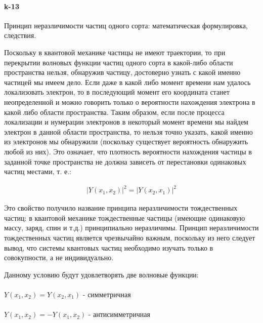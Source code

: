 


\paragraph{k-13}
Принцип неразличимости частиц одного сорта: математическая формулировка, следствия.


Поскольку в квантовой механике частицы не имеют траектории, то при перекрытии волновых функции частиц одного сорта в какой-либо области пространства нельзя, обнаружив частицу, достоверно узнать с какой именно частицей мы имеем дело. Если даже в какой либо момент времени нам удалось локализовать электрон, то в последующий момент его координата станет неопределенной и можно говорить только о вероятности нахождения электрона в какой либо области пространства. Таким образом, если после процесса локализации и нумерации электронов в некоторый момент времени мы найдем электрон в данной области пространства, то нельзя точно указать, какой именно из электронов мы обнаружили (поскольку существует вероятность обнаружить любой из них). Это означает, что плотность вероятности  нахождения частицы в заданной точке пространства не должна зависеть от перестановки одинаковых частиц местами, т. е.:

\begin{gather*}
	|Y(x_1,x_2)|^2 = |Y(x_2,x_1)|^2
\end{gather*}

Это свойство получило название принципа неразличимости тождественных частиц: в квантовой механике тождественные частицы (имеющие одинаковую массу, заряд, спин и т.д.) принципиально неразличимы. Принцип неразличимости тождественных частиц является чрезвычайно важным, поскольку	из него следует вывод, что системы квантовых частиц необходимо изучать только в совокупности, а не индивидуально.

Данному условию будут удовлетворять две волновые функции:\\\\
$Y(x_1,x_2) = Y(x_2,x_1)$ - симметричная\\\\
$Y(x_1,x_2) = -Y(x_1,x_2)$ - антисимметричная

